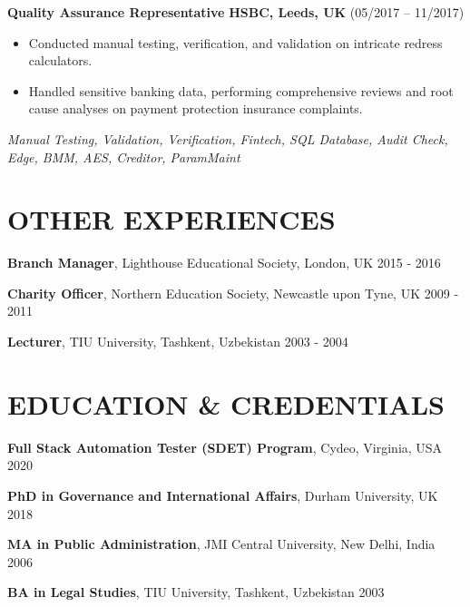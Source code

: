 \documentclass[11pt,a4paper,sans]{moderncv}
\begin{document}
    \noindent \textbf{Quality Assurance Representative} \hfill \textbf{HSBC, Leeds, UK} (05/2017 – 11/2017) \\
    \begin{itemize}
        \item Conducted manual testing, verification, and validation on intricate redress calculators.
        \item Handled sensitive banking data, performing comprehensive reviews and root cause analyses on payment protection insurance complaints.
    \end{itemize}
    \small \textit{Manual Testing, Validation, Verification, Fintech, SQL Database, Audit Check, Edge, BMM, AES, Creditor, ParamMaint}

    \section*{OTHER EXPERIENCES}

    \noindent \textbf{Branch Manager}, Lighthouse Educational Society, London, UK \hfill 2015 - 2016

    \noindent \textbf{Charity Officer}, Northern Education Society, Newcastle upon Tyne, UK \hfill 2009 - 2011

    \noindent \textbf{Lecturer}, TIU University, Tashkent, Uzbekistan \hfill 2003 - 2004

    \section*{EDUCATION \& CREDENTIALS}

    \noindent \textbf{Full Stack Automation Tester (SDET) Program}, Cydeo, Virginia, USA \hfill 2020

    \noindent \textbf{PhD in Governance and International Affairs}, Durham University, UK \hfill 2018

    \noindent \textbf{MA in Public Administration}, JMI Central University, New Delhi, India \hfill 2006

    \noindent \textbf{BA in Legal Studies}, TIU University, Tashkent, Uzbekistan \hfill 2003
\end{document}
